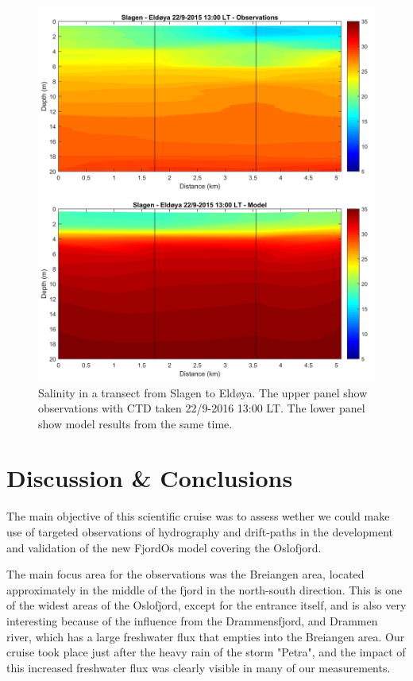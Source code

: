 \documentclass[12pt,a4paper,english]{article}
\begin{document}
\begin{figure}[ht]
\centerline{
\includegraphics*[width=\textwidth]{Figurer/Transect_S_salt.png}}
\caption{\small
Salinity in a transect from Slagen to Eld{\o}ya. 
The upper panel show observations with CTD taken
22/9-2016 13:00 LT. The lower panel show model results from the same time.}
\label{fig:CTD_Mod_S}
\end{figure}

\clearpage

\section{Discussion \& Conclusions}

The main objective of this scientific cruise was to assess wether we could make use of targeted observations of hydrography and drift-paths in the development and validation of the new FjordOs model covering the Oslofjord.

The main focus area for the observations was the Breiangen area, located approximately in the middle of the fjord in the north-south direction. This is one of the widest areas of the Oslofjord, except for the entrance itself, and is also very interesting because of the influence from the Drammensfjord, and Drammen river, which has a large freshwater flux that empties into the Breiangen area. Our cruise took place just after the heavy rain of the storm "Petra", and the impact of this increased freshwater flux was clearly visible in many of our measurements.
\end{document}
